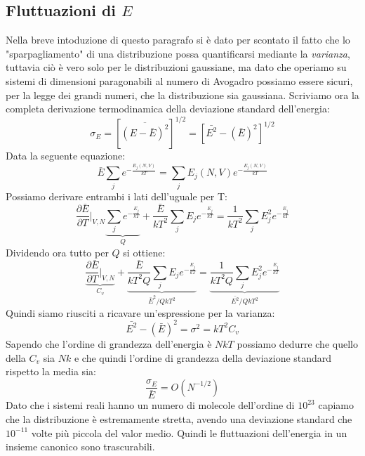 \documentclass[oneside]{amsbook}
\numberwithin{section}{chapter}
\numberwithin{equation}{section}
\numberwithin{figure}{section}
\begin{document}
\subsection{Fluttuazioni di $E$}
Nella breve intoduzione di questo paragrafo si è dato per scontato il fatto che lo "sparpagliamento" di una distribuzione possa quantificarsi mediante la \emph{varianza}, tuttavia ciò è vero solo per le distribuzioni gaussiane, ma dato che operiamo su sistemi di dimensioni paragonabili al numero di Avogadro possiamo essere sicuri, per la legge dei grandi numeri, che la distribuzione sia gaussiana.
Scriviamo ora la completa derivazione termodinamica della deviazione standard dell'energia:
\begin{equation}
\sigma_E=\left[\overline{\left(E-\bar{E}\right)^2}\right]^{1/2}= \left[ \bar{E^2}-(\bar{E})^2\right]^{1/2}
\end{equation}
Data la seguente equazione:
\begin{equation}
\bar{E}\sum_j e^{-\frac{E_j(N,V)}{kT}}=\sum_j E_j(N,V) e^{-\frac{E_j(N,V)}{kT}}
\end{equation}
Possiamo derivare entrambi i lati dell'uguale per T:
\begin{equation}
\frac{\partial\bar{E}}{\partial T}\biggr\rvert_{V,N}\underbrace{\sum_je^{-\frac{E_j}{kT}}}_{Q}+\frac{\bar{E}}{kT^2}\sum_jE_je^{-\frac{E_j}{kT}}=\frac{1}{kT^2}\sum_jE_j^2e^{-\frac{E_j}{kT}}
\end{equation}
Dividendo ora tutto per $Q$ si ottiene:
\begin{equation}
\underbrace{\frac{\partial\bar{E}}{\partial T}\biggr\rvert_{V,N}}_{C_v}+\underbrace{\frac{\bar{E}}{kT^2Q}\sum_jE_je^{-\frac{E_j}{kT}}}_{\bar{E}^2/QkT^2}=\underbrace{\frac{1}{kT^2Q}\sum_jE_j^2e^{-\frac{E_j}{kT}}}_{\bar{E^2}/QkT^2}
\end{equation}
Quindi siamo riusciti a ricavare un'espressione per la varianza:
\begin{equation}
\bar{E^2}-(\bar{E})^2=\sigma^2=kT^2C_v
\end{equation}
Sapendo che l'ordine di grandezza dell'energia è $NkT$ possiamo dedurre che quello della $C_v$ sia $Nk$ e che quindi l'ordine di grandezza della deviazione standard rispetto la media sia:
\begin{equation}
\frac{\sigma_E}{\bar{E}}=O(N^{-1/2})
\end{equation}
Dato che i sistemi reali hanno un numero di molecole dell'ordine di $10^{23}$ capiamo che la distribuzione è estremamente stretta, avendo una deviazione standard che $10^{-11}$ volte più piccola del valor medio. Quindi le fluttuazioni dell'energia in un  insieme canonico sono trascurabili.
\end{document}
